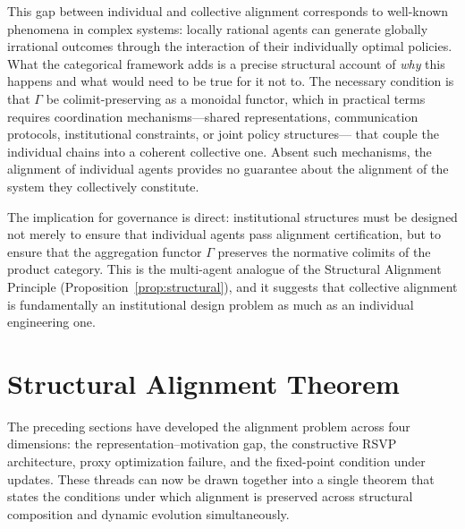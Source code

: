 \documentclass[12pt]{article}
\theoremstyle{definition}
\begin{document}
This gap between individual and collective alignment corresponds to well-known
phenomena in complex systems: locally rational agents can generate globally
irrational outcomes through the interaction of their individually optimal
policies. What the categorical framework adds is a precise structural account
of \emph{why} this happens and what would need to be true for it not to. The
necessary condition is that $\Gamma$ be colimit-preserving as a monoidal functor,
which in practical terms requires coordination mechanisms---shared representations,
communication protocols, institutional constraints, or joint policy structures---
that couple the individual chains into a coherent collective one. Absent such
mechanisms, the alignment of individual agents provides no guarantee about the
alignment of the system they collectively constitute.

The implication for governance is direct: institutional structures must be
designed not merely to ensure that individual agents pass alignment certification,
but to ensure that the aggregation functor $\Gamma$ preserves the normative
colimits of the product category. This is the multi-agent analogue of the
Structural Alignment Principle (Proposition~\ref{prop:structural}), and it
suggests that collective alignment is fundamentally an institutional design
problem as much as an individual engineering one.

\section{Structural Alignment Theorem}

The preceding sections have developed the alignment problem across four
dimensions: the representation--motivation gap, the constructive RSVP
architecture, proxy optimization failure, and the fixed-point condition under
updates. These threads can now be drawn together into a single theorem that
states the conditions under which alignment is preserved across structural
composition and dynamic evolution simultaneously.
\end{document}
